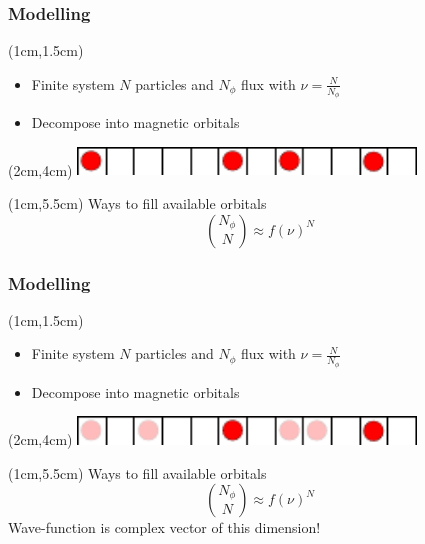 \documentclass[xcolor=pdftex,dvipsnames]{beamer}
\begin{document}
\begin{frame}[t]
    \frametitle{Modelling}
    \begin{textblock*}{12cm}(1cm,1.5cm) %
    \begin{itemize}
       \item Finite system $N$ particles and $N_{\phi}$ flux with $\nu = \frac{N}{N_{\phi}}$
       \item Decompose into magnetic orbitals
    \end{itemize}
    \end{textblock*}
    \begin{textblock*}{9cm}(2cm,4cm) %
        \includegraphics[width=9cm]{effective_1d_model3}
    \end{textblock*}

    \begin{textblock*}{12cm}(1cm,5.5cm) %
    Ways to fill available orbitals
    \begin{equation*}
      {N_{\phi}\choose N} \approx f(\nu)^N
    \end{equation*}
    \end{textblock*}
\end{frame}

\begin{frame}[t]
    \frametitle{Modelling}
    \begin{textblock*}{12cm}(1cm,1.5cm) %
    \begin{itemize}
       \item Finite system $N$ particles and $N_{\phi}$ flux with $\nu = \frac{N}{N_{\phi}}$
       \item Decompose into magnetic orbitals
    \end{itemize}
    \end{textblock*}
    \begin{textblock*}{9cm}(2cm,4cm) %
        \includegraphics[width=9cm]{effective_1d_model_superposition}
    \end{textblock*}

    \begin{textblock*}{12cm}(1cm,5.5cm) %
    Ways to fill available orbitals
    \begin{equation*}
      {N_{\phi}\choose N} \approx f(\nu)^N
    \end{equation*}
    Wave-function is complex vector of this dimension!
    \end{textblock*}
\end{frame}
\end{document}
